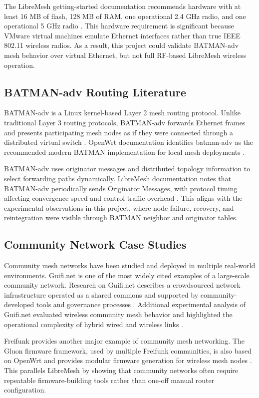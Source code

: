 \documentclass[conference]{IEEEtran}
\begin{document}
The LibreMesh getting-started documentation recommends hardware with at least 16 MB of flash, 128 MB of RAM, one operational 2.4 GHz radio, and one operational 5 GHz radio \cite{libremeshgettingstarted}. This hardware requirement is significant because VMware virtual machines emulate Ethernet interfaces rather than true IEEE 802.11 wireless radios. As a result, this project could validate BATMAN-adv mesh behavior over virtual Ethernet, but not full RF-based LibreMesh wireless operation.

\subsection{BATMAN-adv Routing Literature}

BATMAN-adv is a Linux kernel-based Layer 2 mesh routing protocol. Unlike traditional Layer 3 routing protocols, BATMAN-adv forwards Ethernet frames and presents participating mesh nodes as if they were connected through a distributed virtual switch \cite{batmanadvdocs}. OpenWrt documentation identifies batman-adv as the recommended modern BATMAN implementation for local mesh deployments \cite{openwrtbatman}.

BATMAN-adv uses originator messages and distributed topology information to select forwarding paths dynamically. LibreMesh documentation notes that BATMAN-adv periodically sends Originator Messages, with protocol timing affecting convergence speed and control traffic overhead \cite{libremeshprotocols}. This aligns with the experimental observations in this project, where node failure, recovery, and reintegration were visible through BATMAN neighbor and originator tables.

\subsection{Community Network Case Studies}

Community mesh networks have been studied and deployed in multiple real-world environments. Guifi.net is one of the most widely cited examples of a large-scale community network. Research on Guifi.net describes a crowdsourced network infrastructure operated as a shared commons and supported by community-developed tools and governance processes \cite{guifinetcommons}. Additional experimental analysis of Guifi.net evaluated wireless community mesh behavior and highlighted the operational complexity of hybrid wired and wireless links \cite{guifinetexperimental}.

Freifunk provides another major example of community mesh networking. The Gluon firmware framework, used by multiple Freifunk communities, is also based on OpenWrt and provides modular firmware generation for wireless mesh nodes \cite{gluon}. This parallels LibreMesh by showing that community networks often require repeatable firmware-building tools rather than one-off manual router configuration.
\end{document}
